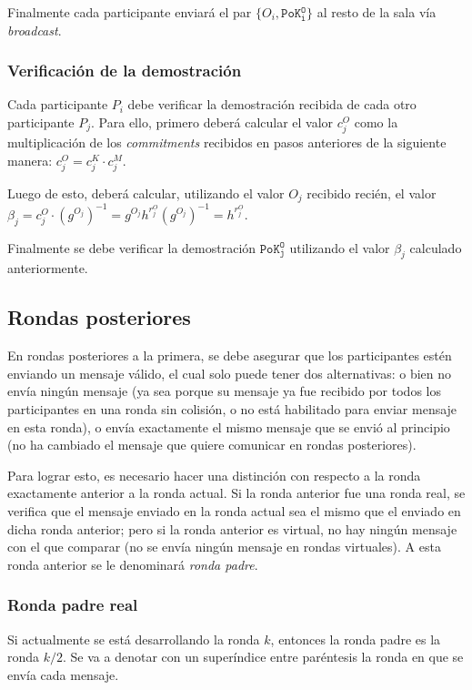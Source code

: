 Finalmente cada participante enviará el par $\{O_i, \mathtt{PoK_i^O}\}$ al resto de la sala vía \emph{broadcast}.

\subsubsection{Verificación de la demostración}

Cada participante $P_i$ debe verificar la demostración recibida de cada otro participante $P_j$. Para ello, primero deberá calcular el valor $c_j^O$ como la multiplicación de los \emph{commitments} recibidos en pasos anteriores de la siguiente manera: $c_j^O = c_j^K \cdot c_j^M$.

Luego de esto, deberá calcular, utilizando el valor $O_j$ recibido recién, el valor $\beta_j = c_j^O \cdot (g^{O_j})^{-1} = g^{O_j} h^{r_j^O} (g^{O_j})^{-1} = h^{r_j^O}$.

Finalmente se debe verificar la demostración $\mathtt{PoK_j^O}$ utilizando el valor $\beta_j$ calculado anteriormente.

\subsection{Rondas posteriores}

En rondas posteriores a la primera, se debe asegurar que los participantes estén enviando un mensaje válido, el cual solo puede tener dos alternativas: o bien no envía ningún mensaje (ya sea porque su mensaje ya fue recibido por todos los participantes en una ronda sin colisión, o no está habilitado para enviar mensaje en esta ronda), o envía exactamente el mismo mensaje que se envió al principio (no ha cambiado el mensaje que quiere comunicar en rondas posteriores).

Para lograr esto, es necesario hacer una distinción con respecto a la ronda exactamente anterior a la ronda actual. Si la ronda anterior fue una ronda real, se verifica que el mensaje enviado en la ronda actual sea el mismo que el enviado en dicha ronda anterior; pero si la ronda anterior es virtual, no hay ningún mensaje con el que comparar (no se envía ningún mensaje en rondas virtuales). A esta ronda anterior se le denominará \emph{ronda padre}.

\subsubsection{Ronda padre real}

Si actualmente se está desarrollando la ronda $k$, entonces la ronda padre es la ronda $k/2$. Se va a denotar con un superíndice entre paréntesis la ronda en que se envía cada mensaje.

